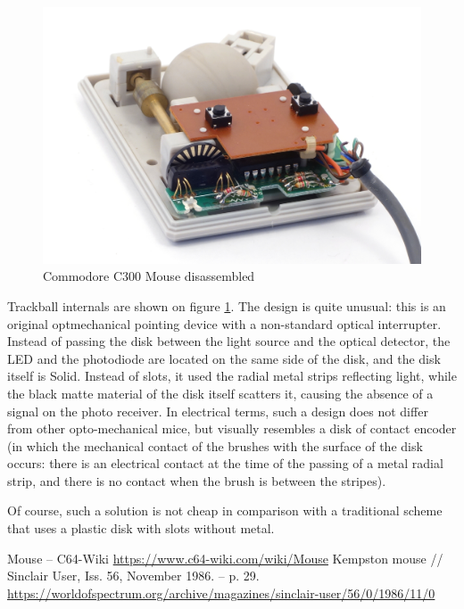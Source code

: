 \documentclass[11pt, a4paper]{article}
\begin{document}
\begin{figure}[h]
    \centering
    \includegraphics[scale=0.7]{1986_commodore_c300_mouse/cm4raz_30.jpg}
    \caption{Commodore C300 Mouse disassembled}
    \label{fig:C300Inside}
\end{figure}

Trackball internals are shown on figure \ref{fig:C300Inside}. The design is quite unusual: this is an original optmechanical pointing device with a non-standard optical interrupter. Instead of passing the disk between the light source and the optical detector, the LED and the photodiode are located on the same side of the disk, and the disk itself is Solid. Instead of slots, it used the radial metal strips reflecting light, while the black matte material of the disk itself scatters it, causing the absence of a signal on the photo receiver. In electrical terms, such a design does not differ from other opto-mechanical mice, but visually resembles a disk of contact encoder (in which the mechanical contact of the brushes with the surface of the disk occurs: there is an electrical contact at the time of the passing of a metal radial strip, and there is no contact when the brush is between the stripes).

Of course, such a solution is not cheap in comparison with a traditional scheme that uses a plastic disk with slots without metal.

\begin{thebibliography}{9}
 Mouse -- C64-Wiki \url{https://www.c64-wiki.com/wiki/Mouse}
 Kempston mouse // Sinclair User, Iss. 56, November 1986. -- p. 29. \url{https://worldofspectrum.org/archive/magazines/sinclair-user/56/0/1986/11/0}
\end{thebibliography}
\end{document}
